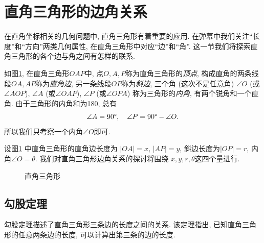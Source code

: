 \section{直角三角形的边角关系} \label{sec:triangle}

在直角坐标相关的几何问题中, 直角三角形有着重要的应用.
在弹幕中我们关注``长度''和``方向''两类几何属性,
在直角三角形中对应``边''和``角''.
这一节我们将探索直角三角形的各个边与角之间有怎样的联系.

如图\ref{fig:triangle},
在直角三角形$OAP$中, 点$O,A,P$称为直角三角形的\emph{顶点},
构成直角的两条线段$OA,AP$称为\emph{直角边},
另一条线段$OP$称为\emph{斜边},
三个角 (这次不是任意角)
$\angle{O}$ (或$\angle{AOP}$),
$\angle{A}$ (或$\angle{OAP}$),
$\angle{P}$ (或$\angle{OPA}$)
称为三角形的\emph{内角}, 有两个锐角和一个直角.
由于三角形的内角和为180\degree, 总有
\[
  \angle{A} = 90\degree,\quad
  \angle{P} = 90\degree - \angle{O}.
\]
所以我们只考察一个内角$\angle{O}$即可.

设图\ref{fig:triangle}
中直角三角形的直角边长度为
$|OA|=x$, $|AP|=y$, 斜边长度为$|OP|=r$,
内角$\angle{O}=\theta$.
我们对直角三角形边角关系的探讨将围绕
$x,y,r,\theta$这四个量进行.

\begin{figure}[htbp]
  \centering
  \caption{直角三角形}
  \label{fig:triangle}
\end{figure}

\subsection{勾股定理}

勾股定理描述了直角三角形三条边的长度之间的关系.
该定理指出, 已知直角三角形的任意两条边的长度,
可以计算出第三条的边的长度.

